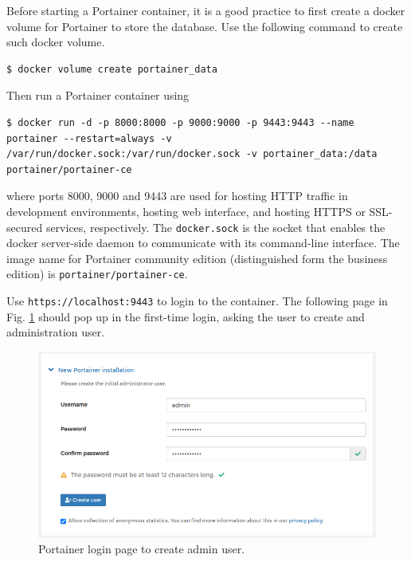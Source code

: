 Before starting a Portainer container, it is a good practice to first create a docker volume for Portainer to store the database. Use the following command to create such docker volume.
\begin{lstlisting}
$ docker volume create portainer_data
\end{lstlisting}
Then run a Portainer container using
\begin{lstlisting}
$ docker run -d -p 8000:8000 -p 9000:9000 -p 9443:9443 --name portainer --restart=always -v /var/run/docker.sock:/var/run/docker.sock -v portainer_data:/data portainer/portainer-ce
\end{lstlisting}
where ports 8000, 9000 and 9443 are used for hosting HTTP traffic in development environments, hosting web interface, and hosting HTTPS or SSL-secured services, respectively. The \verb|docker.sock| is the socket that enables the docker server-side daemon to communicate with its command-line interface. The image name for Portainer community edition (distinguished form the business edition) is \verb|portainer/portainer-ce|.

Use \verb|https://localhost:9443| to login to the container. The following page in Fig. \ref{ch:vac:fig:portainerlogin} should pop up in the first-time login, asking the user to create and administration user.
\begin{figure}[!htb]
	\centering
	\includegraphics[width=350pt]{chapters/part-3/figures/portainerlogin.png}
	\caption{Portainer login page to create admin user.} \label{ch:vac:fig:portainerlogin}
\end{figure}


